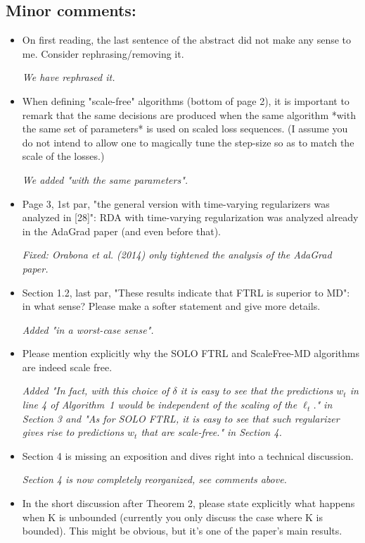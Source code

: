 \documentclass{article}
\begin{document}
\subsection{Minor comments:}
\begin{itemize}
\item On first reading, the last sentence of the abstract did not make any sense to me. Consider rephrasing/removing it.

\emph{We have rephrased it.}

\item When defining "scale-free" algorithms (bottom of page 2), it is important to remark that the same decisions are produced when the same algorithm *with the same set of parameters* is used on scaled loss sequences. (I assume you do not intend to allow one to magically tune the step-size so as to match the scale of the losses.)

\emph{We added "with the same parameters".}

\item Page 3, 1st par, "the general version with time-varying regularizers was analyzed in [28]": RDA with time-varying regularization was analyzed already in the AdaGrad paper (and even before that).

\emph{Fixed: Orabona et al. (2014) only tightened the analysis of the AdaGrad paper.}

\item Section 1.2, last par, "These results indicate that FTRL is superior to MD": in what sense? Please make a softer statement and give more details.

\emph{Added "in a worst-case sense".}

\item Please mention explicitly why the SOLO FTRL and ScaleFree-MD algorithms are indeed scale free.

\emph{Added "In fact, with this choice of $\delta$ it is easy to see that the predictions $w_t$ in line 4 of Algorithm~1 would be independent of the scaling of the $\ell_t$." in Section 3 and "As for \textsc{SOLO FTRL}, it is easy to see that such regularizer gives rise to predictions $w_t$ that are scale-free." in Section 4.}

\item Section 4 is missing an exposition and dives right into a technical discussion.

\emph{Section 4 is now completely reorganized, see comments above.}

\item In the short discussion after Theorem 2, please state explicitly what happens when K is unbounded (currently you only discuss the case where K is bounded).  This might be obvious, but it's one of the paper's main results.


\end{itemize}
\end{document}
